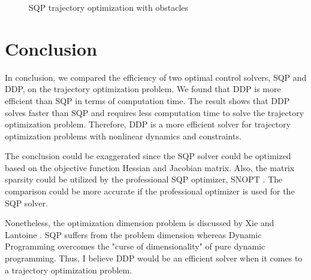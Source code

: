 \documentclass{article}
\begin{document}
\begin{figure}[h!]
\begin{minipage}{0.4\textwidth}
        \caption{SQP trajectory optimization with obstacles}
        \label{fig:sqp-with-obstacles}
    \end{minipage}
    \label{fig:two-figures}
\end{figure}


\section{Conclusion}

In conclusion, we compared the efficiency of two optimal control solvers, SQP and DDP, on the trajectory optimization problem. We found that DDP is more efficient than SQP in terms of computation time. The result shows that DDP solves faster than SQP and requires less computation time to solve the trajectory optimization problem. Therefore, DDP is a more efficient solver for trajectory optimization problems with nonlinear dynamics and constraints.

The conclusion could be exaggerated since the SQP solver could be optimized based on the objective function Hessian and Jacobian matrix. Also, the matrix sparsity could be utilized by the professional SQP optimizer, SNOPT \cite{gill2005snopt}. The comparison could be more accurate if the professional optimizer is used for the SQP solver.

Nonetheless, the optimization dimension problem is discussed by Xie \cite{CDDP} and Lantoine \cite{lantoine2012hybrid}. SQP suffers from the problem dimension whereas Dynamic Programming overcomes the "curse of dimensionality" of pure dynamic programming. Thus, I believe DDP would be an efficient solver when it comes to a trajectory optimization problem. 


\nocite{*} 
\end{document}
